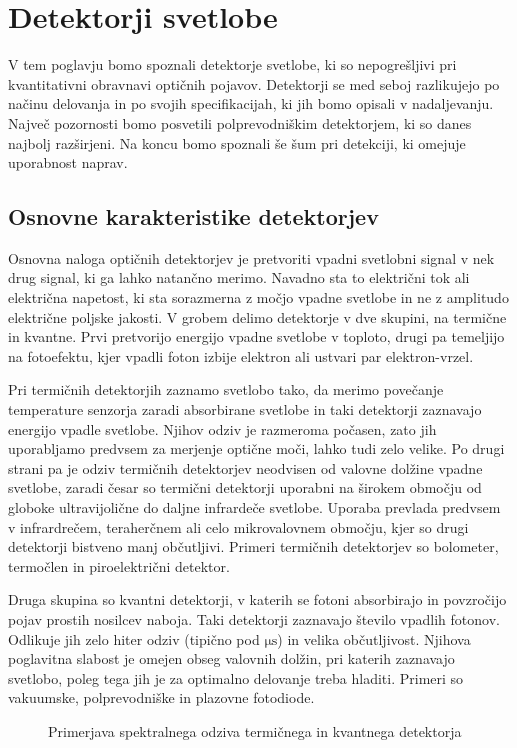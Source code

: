 
\chapter{Detektorji svetlobe}

V tem poglavju bomo spoznali detektorje svetlobe, ki so nepogrešljivi
pri kvantitativni obravnavi optičnih pojavov. Detektorji se med seboj razlikujejo
po načinu delovanja in po svojih specifikacijah, ki jih bomo opisali v nadaljevanju. Največ
pozornosti bomo posvetili polprevodniškim detektorjem, ki so danes najbolj razširjeni.
Na koncu bomo spoznali še šum pri detekciji, ki omejuje uporabnost naprav.

\section{Osnovne karakteristike detektorjev}

Osnovna naloga optičnih detektorjev je pretvoriti vpadni svetlobni signal 
v nek drug signal, ki ga lahko natančno merimo. Navadno sta to električni tok 
ali električna napetost, ki sta sorazmerna z močjo vpadne svetlobe 
in ne z amplitudo električne poljske jakosti. V grobem delimo detektorje v dve skupini, 
na termične in kvantne. Prvi pretvorijo energijo vpadne svetlobe 
v toploto, drugi pa temeljijo na fotoefektu, kjer vpadli foton izbije elektron ali 
ustvari par elektron-vrzel.

Pri termičnih detektorjih zaznamo svetlobo tako,
da merimo povečanje temperature senzorja zaradi absorbirane svetlobe in taki detektorji
zaznavajo energijo vpadle svetlobe. Njihov odziv je razmeroma počasen, zato jih uporabljamo
predvsem za merjenje optične moči, lahko tudi zelo velike. Po drugi strani pa je odziv
termičnih detektorjev neodvisen
od valovne dolžine vpadne svetlobe, zaradi česar so termični detektorji uporabni na 
širokem območju od globoke ultravijolične do daljne infrardeče svetlobe. Uporaba
prevlada predvsem v infrardrečem, teraherčnem ali celo mikrovalovnem območju, kjer so 
drugi detektorji bistveno manj občutljivi. 
Primeri termičnih detektorjev so bolometer, termočlen in piroelektrični detektor.

Druga skupina so kvantni detektorji, v katerih se
fotoni absorbirajo in povzročijo pojav prostih nosilcev naboja. Taki detektorji
zaznavajo število vpadlih fotonov. Odlikuje jih zelo hiter odziv 
(tipično pod $\si{\micro\second}$)
in velika občutljivost. Njihova poglavitna slabost je omejen obseg valovnih dolžin,
pri katerih zaznavajo svetlobo, poleg tega jih je za optimalno delovanje treba 
hladiti. Primeri so vakuumske, polprevodniške in plazovne fotodiode.
\begin{figure}[h]
\centering
\def\svgwidth{65truemm} 

\caption{Primerjava spektralnega odziva termičnega in kvantnega detektorja}
\label{fig:shemaTermKv}
\end{figure}

